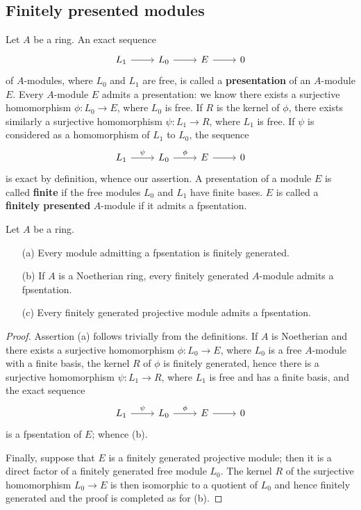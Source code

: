 \subsection{Finitely presented modules}
Let $A$ be a ring. An exact sequence
\[\begin{tikzcd}
L_1\ar[r]&L_0\ar[r]&E\ar[r]&0
\end{tikzcd}\]
of $A$-modules, where $L_0$ and $L_1$ are free, is called a \textbf{presentation} of an $A$-module $E$. Every $A$-module $E$ admits a presentation: we know there exists a surjective homomorphism $\phi:L_0\to E$, where $L_0$ is free. If $R$ is the kernel of $\phi$, there exists similarly a surjective homomorphism $\psi:L_1\to R$, where $L_1$ is free. If $\psi$ is considered as a homomorphism of $L_1$ to $L_0$, the sequence
\[\begin{tikzcd}
L_1\ar[r,"\psi"]&L_0\ar[r,"\phi"]&E\ar[r]&0
\end{tikzcd}
\]
is exact by definition, whence our assertion. A presentation of a module $E$ is called \textbf{finite} if the free modules $L_0$ and $L_1$ have finite bases. $E$ is called a \textbf{finitely presented} $A$-module if it admits a fpsentation.
\begin{proposition}\label{module fpsented if other prop}
Let $A$ be a ring.
\begin{itemize}
\item[(a)] Every module admitting a fpsentation is finitely generated.
\item[(b)] If $A$ is a Noetherian ring, every finitely generated $A$-module admits a fpsentation.
\item[(c)] Every finitely generated projective module admits a fpsentation.
\end{itemize}
\end{proposition}
\begin{proof}
Assertion (a) follows trivially from the definitions. If $A$ is Noetherian and there exists a surjective homomorphism $\phi:L_0\to E$, where $L_0$ is a free $A$-module with a finite basis, the kernel $R$ of $\phi$ is finitely generated, hence there is a surjective homomorphism $\psi:L_1\to R$, where $L_1$ is free and has a finite basis, and the exact sequence \[\begin{tikzcd}
L_1\ar[r,"\psi"]&L_0\ar[r,"\phi"]&E\ar[r]&0 \end{tikzcd}\]
is a fpsentation of $E$; whence (b).\par
Finally, suppose that $E$ is a finitely generated projective module; then it is a direct factor of a finitely generated free module $L_0$. The kernel $R$ of the surjective homomorphism $L_0\to E$ is then isomorphic to a quotient of $L_0$ and hence finitely generated and the proof is completed as for (b).
\end{proof}
